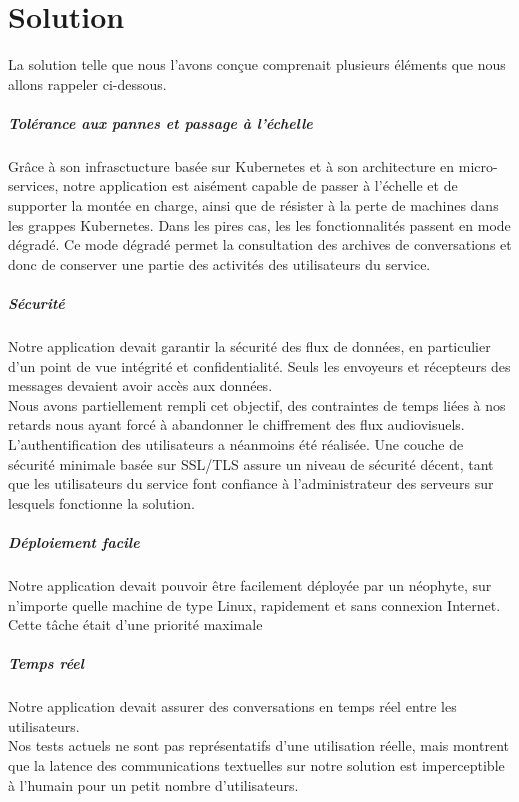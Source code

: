 \chapter{Solution}

La solution telle que nous l'avons conçue comprenait plusieurs
éléments que nous allons rappeler ci-dessous.

\paragraph{Tolérance aux pannes et passage à l'échelle} Grâce
à son infrasctucture basée sur Kubernetes et à son
architecture en micro-services, notre application est
aisément capable de passer à l'échelle et de supporter la
montée en charge, ainsi que de résister à la perte de
machines dans les grappes Kubernetes. Dans les pires cas, les
les fonctionnalités passent en mode dégradé. Ce mode dégradé
permet la consultation des archives de conversations et donc
de conserver une partie des activités des utilisateurs du
service.

\paragraph{Sécurité} Notre application devait garantir la
sécurité des flux de données, en particulier d'un point de
vue intégrité et confidentialité. Seuls les envoyeurs et
récepteurs des messages devaient avoir accès aux données.\\
Nous avons partiellement rempli cet objectif, des contraintes
de temps liées à nos retards nous ayant forcé à abandonner le
chiffrement des flux audiovisuels. L'authentification des
utilisateurs a néanmoins été réalisée. Une couche de sécurité
minimale basée sur SSL/TLS assure un niveau de sécurité
décent, tant que les utilisateurs du service font confiance
à l'administrateur des serveurs sur lesquels fonctionne la
solution.

\paragraph{Déploiement facile} Notre application devait
pouvoir être facilement déployée par un néophyte, sur
n'importe quelle machine de type Linux, rapidement et sans
connexion Internet. Cette tâche était d'une priorité maximale

\paragraph{Temps réel} Notre application devait assurer des
conversations en temps réel entre les utilisateurs.\\
Nos tests actuels ne sont pas représentatifs d'une utilisation
réelle, mais montrent que la latence des communications
textuelles sur notre solution est imperceptible à l'humain
pour un petit nombre d'utilisateurs.

